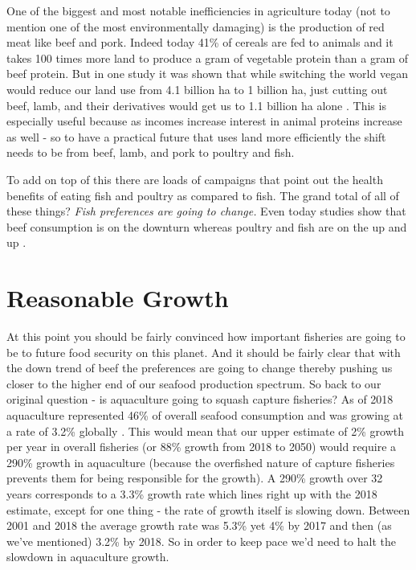 \documentclass[11pt,a5paper]{book}
\begin{document}
One of the biggest and most notable inefficiencies in agriculture today (not to mention one of the most environmentally damaging) is the production of red meat like beef and pork. Indeed today 41\% of cereals are fed to animals and it takes 100 times more land to produce a gram of vegetable protein than a gram of beef protein. But in one study it was shown that while switching the world vegan would reduce our land use from 4.1 billion ha to 1 billion ha, just cutting out beef, lamb, and their derivatives would get us to 1.1 billion ha alone \cite{plantbased}. This is especially useful because as incomes increase interest in animal proteins increase as well \cite{bfafish} - so to have a practical future that uses land more efficiently the shift needs to be from beef, lamb, and pork to poultry and fish.
\newline

To add on top of this there are loads of campaigns that point out the health benefits of eating fish and poultry as compared to fish. The grand total of all of these things? \textit{Fish preferences are going to change.} Even today studies show that beef consumption is on the downturn whereas poultry and fish are on the up and up \cite{wbfish}. 

\section{Reasonable Growth}

At this point you should be fairly convinced how important fisheries are going to be to future food security on this planet. And it should be fairly clear that with the down trend of beef the preferences are going to change thereby pushing us closer to the higher end of our seafood production spectrum. So back to our original question - is aquaculture going to squash capture fisheries? As of 2018 aquaculture represented 46\% of overall seafood consumption and was growing at a rate of 3.2\% globally \cite{faofish}. This would mean that our upper estimate of 2\% growth per year in overall fisheries (or 88\% growth from 2018 to 2050) would require a 290\% growth in aquaculture (because the overfished nature of capture fisheries prevents them for being responsible for the growth). A 290\% growth over 32 years corresponds to a 3.3\% growth rate which lines right up with the 2018 estimate, except for one thing - the rate of growth itself is slowing down. Between 2001 and 2018 the average growth rate was 5.3\% yet 4\% by 2017 and then (as we've mentioned) 3.2\% by 2018. So in order to keep pace we'd need to halt the slowdown in aquaculture growth.
\newline
\end{document}
